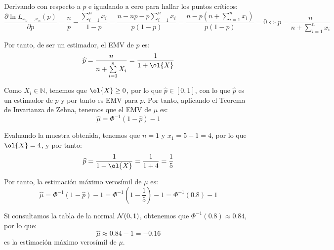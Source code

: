 \begin{ejercicio}
    Derivando con respecto a $p$ e igualando a cero para hallar los puntos críticos:
    \begin{equation*}
        \dfrac{\partial \ln L_{x_1,\ldots,x_n}(p)}{\partial p} = \frac{n}{p} - \frac{\sum\limits_{i=1}^{n}x_i}{1-p} = \frac{n - np - p\sum\limits_{i=1}^{n}x_i}{p(1-p)} = \frac{n - p\left(n+\sum\limits_{i=1}^{n}x_i\right)}{p(1-p)} = 0 \Longleftrightarrow p = \frac{n}{n+\sum\limits_{i=1}^{n}x_i}
    \end{equation*}

    Por tanto, de ser un estimador, el EMV de $p$ es:
    \begin{equation*}
        \widehat{p} = \frac{n}{n+\sum\limits_{i=1}^{n}X_i} = \frac{1}{1+\ol{X}}
    \end{equation*}

    Como $X_i\in \mathbb{N}$, tenemos que $\ol{X}\geq 0$, por lo que $\widehat{p}\in [0,1]$, con lo que $\widehat{p}$ es un estimador de $p$ y por tanto es EMV para $p$. Por tanto, aplicando el Teorema de Invarianza de Zehna, tenemos que el EMV de $\mu$ es:
    \begin{equation*}
        \widehat{\mu} = \Phi^{-1}(1-\widehat{p}) - 1
    \end{equation*}

    Evaluando la muestra obtenida, tenemos que $n=1$ y $x_1=5-1=4$, por lo que $\ol{X} = 4$, y por tanto:
    \begin{equation*}
        \widehat{p} = \frac{1}{1+\ol{X}} = \frac{1}{1+4} = \frac{1}{5}
    \end{equation*}

    Por tanto, la estimación máximo verosímil de $\mu$ es:
    \begin{equation*}
        \widehat{\mu} = \Phi^{-1}(1-\widehat{p}) - 1 = \Phi^{-1}\left(1-\frac{1}{5}\right) - 1 = \Phi^{-1}(0.8) - 1
    \end{equation*}

    Si consultamos la tabla de la normal $\mathcal{N}(0,1)$, obtenemos que $\Phi^{-1}(0.8) \approx 0.84$, por lo que:
    \begin{equation*}
        \widehat{\mu} \approx 0.84 - 1 = -0.16
    \end{equation*}
    es la estimación máximo verosímil de $\mu$.
\end{ejercicio}

